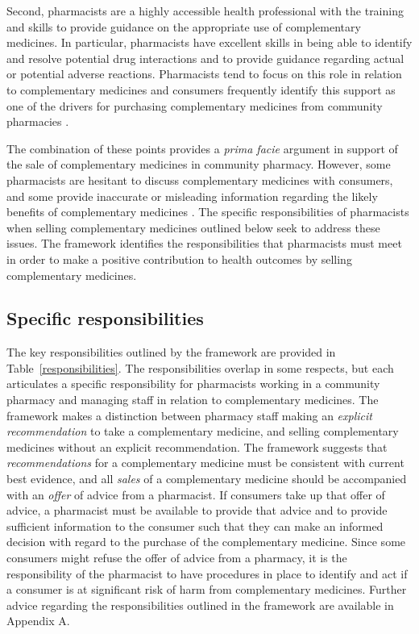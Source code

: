 \documentclass[11pt,a4paper]{article}
\begin{document}
Second, pharmacists are a highly accessible health professional with the
training and skills to provide guidance on the appropriate use of
complementary medicines. In particular, pharmacists have excellent
skills in being able to identify and resolve potential drug interactions
and to provide guidance regarding actual or potential adverse reactions.
Pharmacists tend to focus on this role in relation to complementary
medicines and consumers frequently identify this support as one of the
drivers for purchasing complementary medicines from community pharmacies
\autocites{Olatunde2010}{Kanjanarach2011}.

The combination of these points provides a \emph{prima facie} argument
in support of the sale of complementary medicines in community pharmacy.
However, some pharmacists are hesitant to discuss complementary
medicines with consumers, and some provide inaccurate or misleading
information regarding the likely benefits of complementary medicines
\autocites{SalmanPopattia2018}{Arnold2016}{Bray2017}. The specific
responsibilities of pharmacists when selling complementary medicines
outlined below seek to address these issues. The framework identifies
the responsibilities that pharmacists must meet in order to make a
positive contribution to health outcomes by selling complementary
medicines.

\subsection{Specific responsibilities}\label{specific-responsibilities}

The key responsibilities outlined by the framework are provided in
Table~\ref{responsibilities}. The responsibilities overlap in some
respects, but each articulates a specific responsibility for pharmacists
working in a community pharmacy and managing staff in relation to
complementary medicines. The framework makes a distinction between
pharmacy staff making an \emph{explicit recommendation} to take a
complementary medicine, and selling complementary medicines without an
explicit recommendation. The framework suggests that
\emph{recommendations} for a complementary medicine must be consistent
with current best evidence, and all \emph{sales} of a complementary
medicine should be accompanied with an \emph{offer} of advice from a
pharmacist. If consumers take up that offer of advice, a pharmacist must
be available to provide that advice and to provide sufficient
information to the consumer such that they can make an informed decision
with regard to the purchase of the complementary medicine. Since some
consumers might refuse the offer of advice from a pharmacy, it is the
responsibility of the pharmacist to have procedures in place to identify
and act if a consumer is at significant risk of harm from complementary
medicines. Further advice regarding the responsibilities outlined in the
framework are available in Appendix A.
\end{document}
